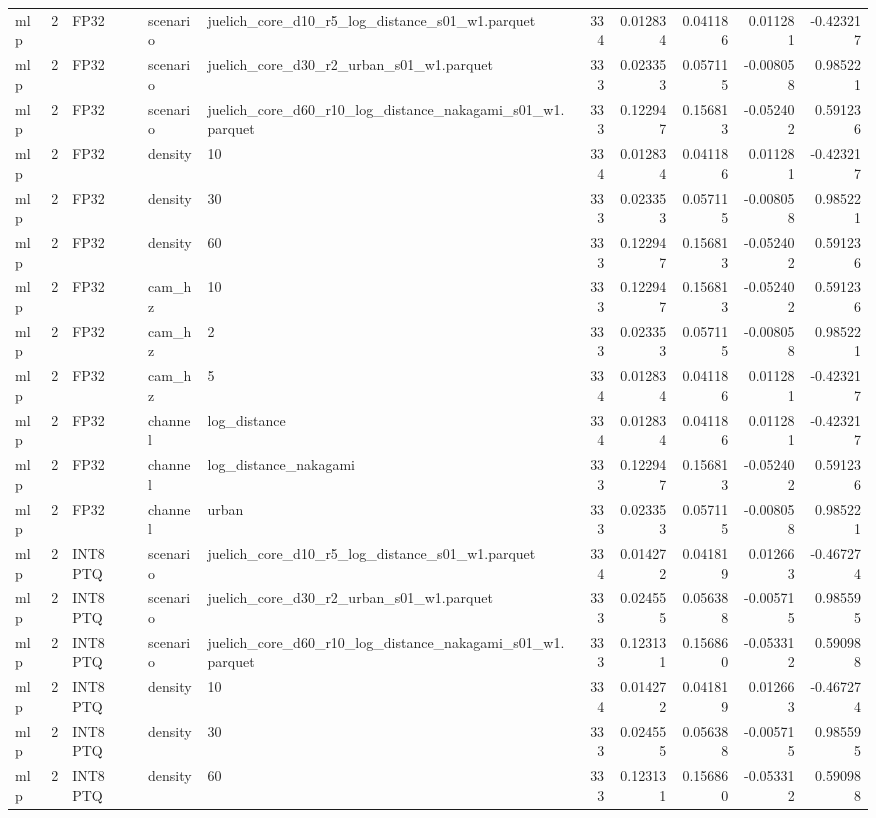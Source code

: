 \begin{tabular}{lrlllrrrrr}
mlp & 2 & FP32 & scenario & juelich\_core\_d10\_r5\_log\_distance\_s01\_w1.parquet & 334 & 0.012834 & 0.041186 & 0.011281 & -0.423217 \\
mlp & 2 & FP32 & scenario & juelich\_core\_d30\_r2\_urban\_s01\_w1.parquet & 333 & 0.023353 & 0.057115 & -0.008058 & 0.985221 \\
mlp & 2 & FP32 & scenario & juelich\_core\_d60\_r10\_log\_distance\_nakagami\_s01\_w1.parquet & 333 & 0.122947 & 0.156813 & -0.052402 & 0.591236 \\
mlp & 2 & FP32 & density & 10 & 334 & 0.012834 & 0.041186 & 0.011281 & -0.423217 \\
mlp & 2 & FP32 & density & 30 & 333 & 0.023353 & 0.057115 & -0.008058 & 0.985221 \\
mlp & 2 & FP32 & density & 60 & 333 & 0.122947 & 0.156813 & -0.052402 & 0.591236 \\
mlp & 2 & FP32 & cam\_hz & 10 & 333 & 0.122947 & 0.156813 & -0.052402 & 0.591236 \\
mlp & 2 & FP32 & cam\_hz & 2 & 333 & 0.023353 & 0.057115 & -0.008058 & 0.985221 \\
mlp & 2 & FP32 & cam\_hz & 5 & 334 & 0.012834 & 0.041186 & 0.011281 & -0.423217 \\
mlp & 2 & FP32 & channel & log\_distance & 334 & 0.012834 & 0.041186 & 0.011281 & -0.423217 \\
mlp & 2 & FP32 & channel & log\_distance\_nakagami & 333 & 0.122947 & 0.156813 & -0.052402 & 0.591236 \\
mlp & 2 & FP32 & channel & urban & 333 & 0.023353 & 0.057115 & -0.008058 & 0.985221 \\
mlp & 2 & INT8 PTQ & scenario & juelich\_core\_d10\_r5\_log\_distance\_s01\_w1.parquet & 334 & 0.014272 & 0.041819 & 0.012663 & -0.467274 \\
mlp & 2 & INT8 PTQ & scenario & juelich\_core\_d30\_r2\_urban\_s01\_w1.parquet & 333 & 0.024555 & 0.056388 & -0.005715 & 0.985595 \\
mlp & 2 & INT8 PTQ & scenario & juelich\_core\_d60\_r10\_log\_distance\_nakagami\_s01\_w1.parquet & 333 & 0.123131 & 0.156860 & -0.053312 & 0.590988 \\
mlp & 2 & INT8 PTQ & density & 10 & 334 & 0.014272 & 0.041819 & 0.012663 & -0.467274 \\
mlp & 2 & INT8 PTQ & density & 30 & 333 & 0.024555 & 0.056388 & -0.005715 & 0.985595 \\
mlp & 2 & INT8 PTQ & density & 60 & 333 & 0.123131 & 0.156860 & -0.053312 & 0.590988 \\

\end{tabular}
